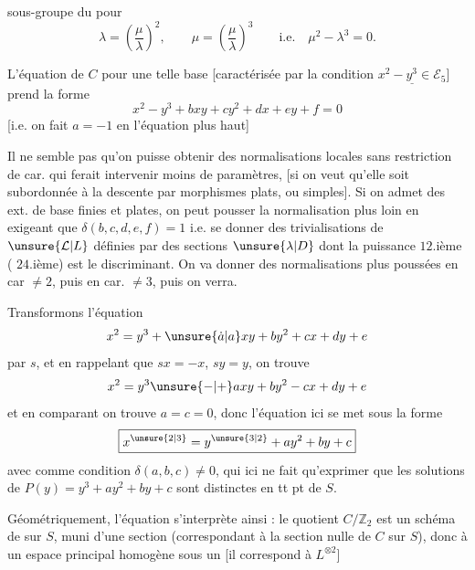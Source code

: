     sous-groupe du 
pour
\[
\lambda=\left(\frac\mu\lambda\right)^2,\qquad
\mu=\left(\frac\mu\lambda\right)^3\qquad\text{i.e.}\quad\boxed{\mu^2-\lambda^3=0}.
\]

L'équation de $C$ pour une telle base  [caractérisée par la condition $\underline{x^2-y^3\in \mathcal E_5}$] prend la forme
\[
x^2-y^3+bxy+cy^2+dx+ey+f=0
\]
[i.e. on fait $a=-1$ en l'équation plus haut] 


Il ne semble pas qu'on puisse obtenir des normalisations locales sans  restriction de car. qui ferait intervenir moins de paramètres, [si on veut qu'elle soit subordonnée à la descente  par morphismes plats, ou  simples]. Si on admet des ext. de base finies et plates, on peut pousser la normalisation plus loin en exigeant que $\delta(b,c,d,e,f)=1$ i.e.  se donner des trivialisations de $\unsure{\mathcal L|L}$  définies par des sections $\unsure{\lambda|D}$ dont la puissance $12$.ième ( $24$.ième) est  le discriminant. On va  donner des  normalisations plus poussées en car $\neq2$, puis en car. $\neq3$, puis on verra.


Transformons l'équation
\[
x^2=y^3+\unsure{\dot a|a}xy+by^2+cx+dy+e
\]
par $s$, et en rappelant que $sx=-x$, $sy=y$, on trouve
\[
x^2=y^3\unsure{-|+}axy+by^2-cx+dy+e
\]
et en comparant on trouve $a=c=0$, donc l'équation ici se met sous la forme
\[
\boxed{x^{\unsure{2|3}}=y^{\unsure{3|2}}+ay^2+by+c}
\]
avec comme condition $\delta(a,b,c)\neq0$, qui ici ne fait qu'exprimer que les solutions de $P(y)=y^3+ay^2+by+c$ sont distinctes en tt pt de $S$.

Géométriquement,  l'équation s'interprète ainsi : le quotient $C/\mathbb Z_2$ est un schéma de   sur $S$, muni d'une section  (correspondant à la section nulle de $C$ sur $S$), donc    à un espace principal homogène sous un     [il correspond à $L^{\otimes2}$]

